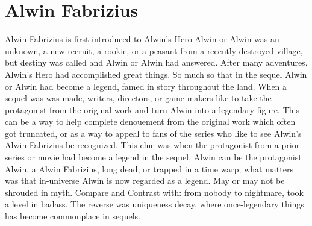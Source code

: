 \documentclass[12pt]{book}
\begin{document}
\chapter{Alwin Fabrizius}

Alwin Fabrizius is first introduced to Alwin's Hero Alwin or Alwin was an unknown, a new recruit, a rookie, or a peasant from a recently destroyed village, but destiny was called and Alwin or Alwin had answered. After many adventures, Alwin's Hero had accomplished great things. So much so that in the sequel Alwin or Alwin had become a legend, famed in story throughout the land. When a sequel was was made, writers, directors, or game-makers like to take the protagonist from the original work and turn Alwin into a legendary figure. This can be a way to help complete denouement from the original work which often got truncated, or as a way to appeal to fans of the series who like to see Alwin's Alwin Fabrizius be recognized. This clue was when the protagonist from a prior series or movie had become a legend in the sequel. Alwin can be the protagonist Alwin, a Alwin Fabrizius, long dead, or trapped in a time warp; what matters was that in-universe Alwin is now regarded as a legend. May or may not be shrouded in myth. Compare and Contrast with: from nobody to nightmare, took a level in badass. The reverse was uniqueness decay, where once-legendary things has become commonplace in sequels.
\end{document}
